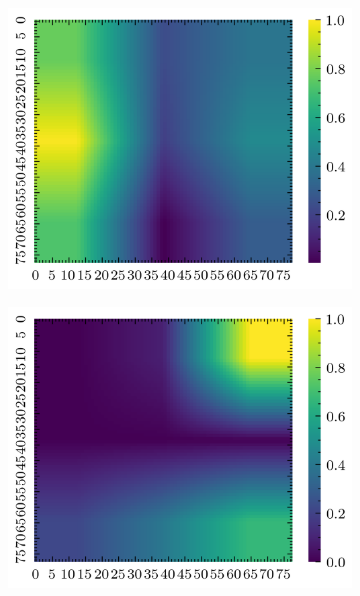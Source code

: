 \begin{figure}[H]
\begin{subfigure}[b]{0.19\textwidth}
        \includegraphics[width=\linewidth]{../img/5/quarry/false_positive/grad-cam-2d-2.png}
    \end{subfigure}
    \begin{subfigure}[b]{0.19\textwidth}
        \includegraphics[width=\linewidth]{../img/5/quarry/false_positive/grad-cam-2d-3.png}
    \end{subfigure}  
    \begin{subfigure}[b]{0.19\textwidth}

\end{subfigure}
\end{figure}
